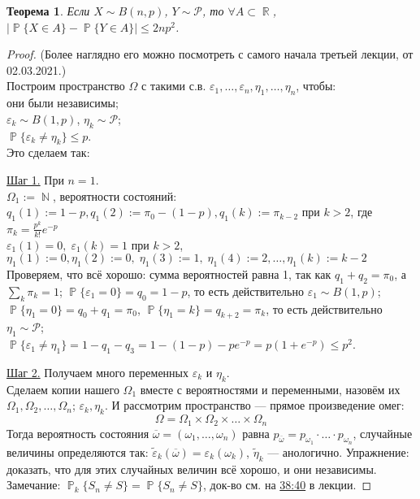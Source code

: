 \documentclass[a4paper,100pt]{article}
\theoremstyle{indented}
\newtheorem{theorem}{Теорема}
\theoremstyle{definition}
\theoremstyle{remark}
\DeclareMathOperator{\RR}{\mathbb{R}}
\DeclareMathOperator{\NN}{\mathbb{N}}
\DeclareMathOperator{\PP}{\mathbb{P}}
\begin{document}
\begin{theorem}
  Если $X \sim B(n, p)$, $Y \sim \mathcal{P}$, то $\forall A \subset \RR$, $|\PP\{X \in A\} - \PP \{ Y \in A \}|\leq 2np^2$.
\end{theorem}
\begin{proof}
    (Более наглядно его можно посмотреть с самого начала третьей лекции, от 02.03.2021.)\\
    Построим пространство $\Omega$ с такими с.в. $\varepsilon_1, \dots, \varepsilon_n, \eta_1, \dots, \eta_n$, чтобы:\\
    они были независимы;\\
    $\varepsilon_k \sim B(1, p)$, $\eta_k \sim \mathcal{P}$;\\
    $\PP\{\varepsilon_k \ne \eta_k\} \le p$.\\
    Это сделаем так:

    \underline{Шаг 1.} При $n = 1$. \\
        $\Omega_1 := \NN$, вероятности состояний: \\
        $q_1(1) := 1-p, q_1(2) := \pi_0 - (1-p), q_1(k) := \pi_{k-2} \text{ при } k>2$, где $\pi_k = \frac{p^k}{k!}e^{-p}$\\
        $\varepsilon_1(1) = 0, \; \varepsilon_1(k) = 1 \text{ при } k > 2$, \\
        $\eta_1(1) := 0, \eta_1(2) := 0, \; \eta_1(3) := 1, \; \eta_1(4) := 2, \dots, \eta_1(k) := k - 2$\\
        Проверяем, что всё хорошо: сумма вероятностей равна 1, так как $q_1 + q_2 = \pi_0$, а $\sum_k \pi_k = 1$; $\PP \{\varepsilon_1 = 0 \} = q_0 = 1 - p$, то есть действительно $\varepsilon_1 \sim B(1, p)$; $\PP\{\eta_1 = 0 \} = q_0 + q_1 = \pi_0$, $\PP\{\eta_1 = k \} = q_{k+2} = \pi_k$, то есть действительно $\eta_1 \sim \mathcal{P}$;\\
        $\PP\{\varepsilon_1 \neq \eta_1\} = 1 - q_1 - q_3 = 1 - (1 - p) - pe^{-p} = p(1 + e^{-p}) \le p^2$.

    \underline{Шаг 2.} Получаем много переменных $\varepsilon_k$ и $\eta_k$.\\
        Сделаем копии нашего $\Omega_1$ вместе с вероятностями и переменными, назовём их $\Omega_1, \Omega_2, \dots, \Omega_n$; $\varepsilon_k, \eta_k$. И рассмотрим пространство --- прямое произведение омег:
        \begin{equation*}
          \Omega = \Omega_1 \times \Omega_2 \times \dots \times \Omega_n
        \end{equation*}
        Тогда вероятность состояния $\overline{\omega} = (\omega_1, \dots, \omega_n)$ равна $p_{\overline{\omega}} = p_{\omega_1} \cdot \dots \cdot p_{\omega_n}$, 
        случайные величины определяются так: $\tilde \varepsilon_k (\overline{\omega}) = \varepsilon_k(\omega_k)$, $\tilde \eta_k$ --- анологично. Упражнение: доказать, что для этих случайных величин всё хорошо, и они независимы. \\
        Замечание: $\PP_k \{ S_n \ne S \} = \PP \{ S_n \ne S \}$, док-во см. на \underline{38:40} в лекции.


\end{proof}
\end{document}

